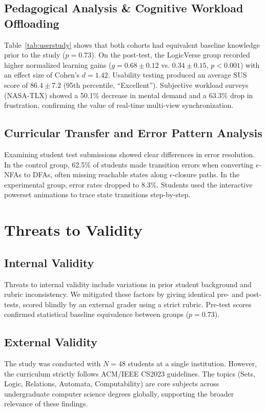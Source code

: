 \documentclass[conference]{IEEEtran}
\begin{document}
\subsection{Pedagogical Analysis \& Cognitive Workload Offloading}
Table~\ref{tab:userstudy} shows that both cohorts had equivalent baseline knowledge prior to the study ($p = 0.73$). On the post-test, the LogicVerse group recorded higher normalized learning gains ($g = 0.68 \pm 0.12$ vs. $0.34 \pm 0.15$, $p < 0.001$) with an effect size of Cohen's $d = 1.42$. Usability testing produced an average SUS score of $86.4 \pm 7.2$ (95th percentile, ``Excellent''). Subjective workload surveys (NASA-TLX) showed a 50.1\% decrease in mental demand and a 63.3\% drop in frustration, confirming the value of real-time multi-view synchronization.

\subsection{Curricular Transfer and Error Pattern Analysis}
Examining student test submissions showed clear differences in error resolution. In the control group, 62.5\% of students made transition errors when converting $\epsilon$-NFAs to DFAs, often missing reachable states along $\epsilon$-closure paths. In the experimental group, error rates dropped to 8.3\%. Students used the interactive powerset animations to trace state transitions step-by-step.

\section{Threats to Validity}
\subsection{Internal Validity}
Threats to internal validity include variations in prior student background and rubric inconsistency. We mitigated these factors by giving identical pre- and post-tests, scored blindly by an external grader using a strict rubric. Pre-test scores confirmed statistical baseline equivalence between groups ($p = 0.73$).

\subsection{External Validity}
The study was conducted with $N = 48$ students at a single institution. However, the curriculum strictly follows ACM/IEEE CS2023 guidelines. The topics (Sets, Logic, Relations, Automata, Computability) are core subjects across undergraduate computer science degrees globally, supporting the broader relevance of these findings.
\end{document}
